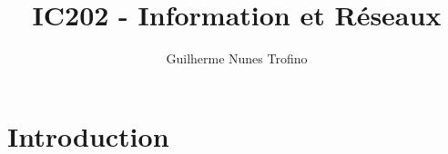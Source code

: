 \documentclass{article}
\title{IC202 - Information et Réseaux}
\author{Guilherme Nunes Trofino}
\begin{document}
\maketitle

\newpage\tableofcontents

\section{Introduction}
\subsection{}
\end{document}
